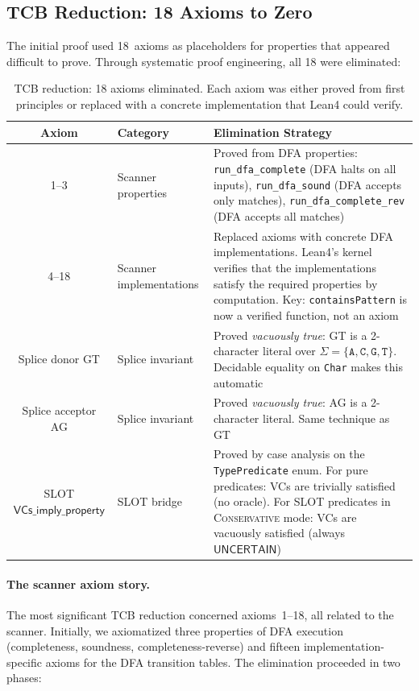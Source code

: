 \documentclass[sigplan,10pt,manuscript,review,anonymous]{acmart}
\newcommand{\UNCERTAIN}{\ensuremath{\mathsf{UNCERTAIN}}\xspace}
\newcommand{\CONSERVATIVE}{\textsc{Conservative}\xspace}
\begin{document}
\subsection{TCB Reduction: 18 Axioms to Zero}\label{sec:tcb-reduction}

The initial proof used 18~axioms as placeholders for properties that
appeared difficult to prove.
Through systematic proof engineering, all 18 were eliminated:

\begin{table}[t]
\centering
\caption{TCB reduction: 18 axioms eliminated. Each axiom was either
         proved from first principles or replaced with a concrete
         implementation that Lean4 could verify.}
\label{tab:axiom-elim}
\begin{tabular}{clp{5.5cm}}
\toprule
\textbf{Axiom} & \textbf{Category} & \textbf{Elimination Strategy} \\
\midrule
1--3 & Scanner properties &
  Proved from DFA properties: \texttt{run\_dfa\_complete}
  (DFA halts on all inputs), \texttt{run\_dfa\_sound}
  (DFA accepts only matches), \texttt{run\_dfa\_complete\_rev}
  (DFA accepts all matches) \\
\midrule
4--18 & Scanner implementations &
  Replaced axioms with concrete DFA implementations.
  Lean4's kernel verifies that the implementations satisfy the
  required properties by computation.
  Key: \texttt{containsPattern} is now a verified function, not
  an axiom \\
\midrule
Splice donor GT & Splice invariant &
  Proved \emph{vacuously true}: GT is a 2-character literal over
  $\Sigma = \{\texttt{A},\texttt{C},\texttt{G},\texttt{T}\}$.
  Decidable equality on \texttt{Char} makes this automatic \\
\midrule
Splice acceptor AG & Splice invariant &
  Proved \emph{vacuously true}: AG is a 2-character literal.
  Same technique as GT \\
\midrule
SLOT $\textsf{VCs\_imply\_property}$ & SLOT bridge &
  Proved by case analysis on the \texttt{TypePredicate} enum.
  For pure predicates: VCs are trivially satisfied (no oracle).
  For SLOT predicates in \CONSERVATIVE{} mode: VCs are vacuously
  satisfied (always \UNCERTAIN) \\
\bottomrule
\end{tabular}
\end{table}

\paragraph{The scanner axiom story.}
The most significant TCB reduction concerned axioms~1--18, all related
to the scanner.
Initially, we axiomatized three properties of DFA execution
(completeness, soundness, completeness-reverse) and fifteen
implementation-specific axioms for the DFA transition tables.
The elimination proceeded in two phases:
\end{document}
